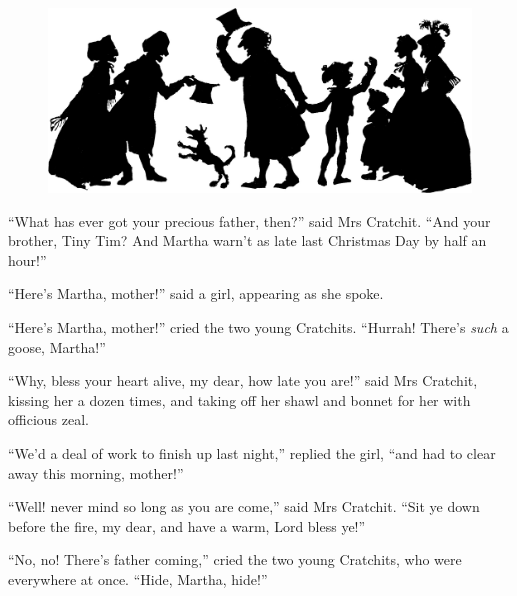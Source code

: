 \documentclass[paper=5.5in:8.5in,BCOR=7mm,twoside,DIV=calc,12pt,usegeometry]{scrbook} %
\begin{document}
\begin{figure}[t!]
\centering
\includegraphics[width=\linewidth]{bloodhorse1}
\end{figure}


\enquote{What has ever got your precious father, then?} said Mrs Cratchit. \enquote{And your brother, Tiny Tim? And Martha warn't as late last Christmas Day by half an hour!}

\enquote{Here's Martha, mother!} said a girl, appearing as she spoke.

\enquote{Here's Martha, mother!} cried the two young Cratchits. \enquote{Hurrah! There's \textit{such} a goose, Martha!}

\enquote{Why, bless your heart alive, my dear, how late you are!} said Mrs Cratchit, kissing her a dozen times, and taking off her shawl and bonnet for her with officious zeal.

\enquote{We'd a deal of work to finish up last night,} replied the girl, \enquote{and had to clear away this morning, mother!}


\enquote{Well! never mind so long as you are come,} said Mrs Cratchit. \enquote{Sit ye down before the fire, my dear, and have a warm, Lord bless ye!}

\enquote{No, no! There's father coming,} cried the two young Cratchits, who were everywhere at once. \enquote{Hide, Martha, hide!}
\end{document}
